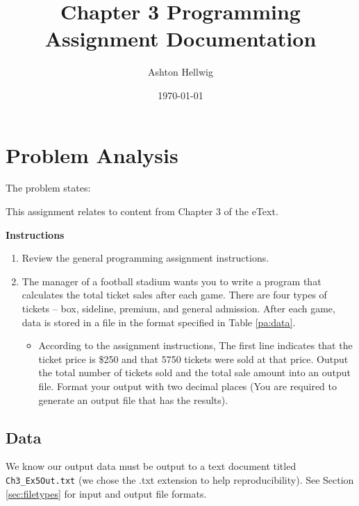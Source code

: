 \documentclass[a4paper, 11pt]{article}
\title{Chapter 3 Programming Assignment Documentation}
\author{Ashton Hellwig}
\date\today
\begin{document}
  \maketitle
  \tableofcontents
  \listofalgorithms
  \lstlistoflistings
  \listoffigures
  \listoftables
  \newpage


  \section{Problem Analysis}
    The problem states:
    \begin{mdframed}[backgroundcolor=green!20]
      This assignment relates to content from Chapter 3 of the eText.

      \textbf{Instructions}\vspace{-8pt}
      \begin{enumerate}
        \item Review the general programming assignment instructions.
        \item%
          The manager of a football stadium wants you to write a program
            that calculates the total ticket sales after each game. There are
            four types of tickets -- box, sideline, premium, and general
            admission. After each game, data is stored in a file in the format
            specified in Table \ref{pa:data}.
            \begin{itemize}
              \item According to the assignment instructions, The first line
                indicates that the ticket price is \$250 and that 5750 tickets
                were sold at that price. Output the total number of tickets sold
                and the total sale amount into an output file. Format your
                output with two decimal places (You are required to generate an
                output file that has the results).
            \end{itemize}
      \end{enumerate}
    \end{mdframed}

    \subsection{Data}
      We know our output data must be output to a text document titled
        \texttt{Ch3\_Ex5Out.txt} (we chose the .txt extension to help
        reproducibility). See Section \ref{sec:filetypes} for input and output
        file formats.
\end{document}

